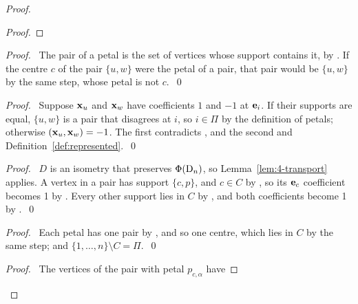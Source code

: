 \begin{proof}
\begin{proof}
 \end{proof}
 \begin{proof}\pf\ The pair of a petal is the set of vertices whose support contains it, by
  . If the centre $c$ of the pair $\{u,w\}$ were the petal of a pair, that
  pair would be $\{u,w\}$ by the same step, whose petal is not $c$.~\qed\end{proof}
 \begin{proof}\pf\ Suppose ${\mathbf x}_u$ and ${\mathbf x}_w$ have coefficients $1$ and $-1$ at ${\mathbf e}_i$. If
  their supports are equal, $\{u,w\}$ is a pair that disagrees at $i$, so $i\in\Pi$ by the
  definition of petals; otherwise $({\mathbf x}_u,{\mathbf x}_w)=-1$. The first contradicts , and the second 
  and Definition~\ref{def:represented}.~\qed\end{proof}
 \begin{proof}\pf\ $D$ is an isometry that preserves $\Phi(\mathrm{D}_n)$, so
  Lemma~\ref{lem:4-transport} applies. A vertex in a pair has support $\{c,p\}$, and
  $c\in C$ by , so its ${\mathbf e}_c$ coefficient becomes 1 by
  . Every other support lies in $C$ by , and both
  coefficients become 1 by .~\qed\end{proof}
 \begin{proof}\pf\ Each petal has one pair by , and so one centre, which lies
  in $C$ by the same step; and $\{1,\dots,n\}\setminus C=\Pi$.~\qed\end{proof}
 \begin{proof}\pf\ The vertices of the pair with petal $p_{c,\alpha}$ have

\end{proof}
\end{proof}
